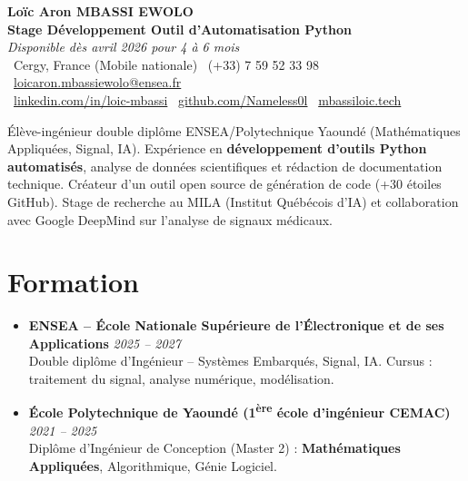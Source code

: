 \documentclass[a4paper,11pt]{article}
\begin{document}
\begin{center}
    {\Large \textbf{Loïc Aron MBASSI EWOLO}} \\ \vspace{4pt}
    \textbf{\large Stage Développement Outil d'Automatisation Python} \\
    \textit{\small Disponible dès avril 2026 pour 4 à 6 mois} \\ \vspace{4pt}
    \small
    \faMapMarker\ Cergy, France (Mobile nationale) \quad
    \faPhone\ (+33) 7 59 52 33 98 \quad
    \faEnvelope\ \href{mailto:loicaron.mbassiewolo@ensea.fr}{loicaron.mbassiewolo@ensea.fr} \\ \vspace{2pt}
    \faLinkedin\ \href{https://www.linkedin.com/in/loic-mbassi/}{linkedin.com/in/loic-mbassi} \quad
    \faGithub\ \href{https://github.com/Nameless0l}{github.com/Nameless0l} \quad
    \faGlobe\ \href{https://mbassiloic.tech}{mbassiloic.tech}
\end{center}

\vspace{-6pt}

\noindent\small{Élève-ingénieur double diplôme ENSEA/Polytechnique Yaoundé (Mathématiques Appliquées, Signal, IA). Expérience en \textbf{développement d'outils Python automatisés}, analyse de données scientifiques et rédaction de documentation technique. Créateur d'un outil open source de génération de code (+30 étoiles GitHub). Stage de recherche au MILA (Institut Québécois d'IA) et collaboration avec Google DeepMind sur l'analyse de signaux médicaux.}

\section{Formation}
\begin{itemize}[leftmargin=*, label=\tiny$\bullet$, nosep]
    \item \textbf{ENSEA -- École Nationale Supérieure de l'Électronique et de ses Applications} \hfill \textit{2025 -- 2027} \\
    \small{Double diplôme d'Ingénieur -- Systèmes Embarqués, Signal, IA. Cursus : traitement du signal, analyse numérique, modélisation.}
    \item \textbf{École Polytechnique de Yaoundé (1\textsuperscript{ère} école d'ingénieur CEMAC)} \hfill \textit{2021 -- 2025} \\
    \small{Diplôme d'Ingénieur de Conception (Master 2) : \textbf{Mathématiques Appliquées}, Algorithmique, Génie Logiciel.}
\end{itemize}
\end{document}
